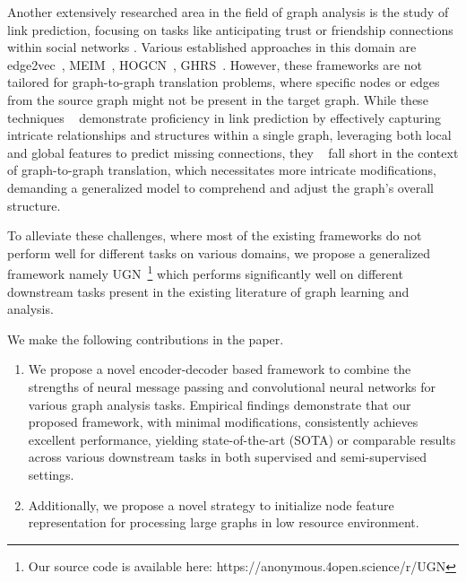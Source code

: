 Another extensively researched area in the field of graph analysis is the study of link prediction, focusing on tasks like anticipating trust or friendship connections within social networks \cite{wang2020edge2vec, Tang-etal12c, leskovec2009community}. Various established approaches in this domain are edge2vec~\cite{wang2020edge2vec}, MEIM~\cite{DBLP:conf/ijcai/TranT22}, HOGCN~\cite{kishan2021predicting}, GHRS~\cite{darban2022ghrs}. However, these frameworks are not tailored for graph-to-graph translation problems, where specific nodes or edges from the source graph might not be present in the target graph. While these techniques ~\cite{wang2020edge2vec,kishan2021predicting} demonstrate proficiency in link prediction by effectively capturing intricate relationships and structures within a single graph, leveraging both local and global features to predict missing connections, they ~\cite{wang2020edge2vec,darban2022ghrs} fall short in the context of graph-to-graph translation, which necessitates more intricate modifications, demanding a generalized model to comprehend and adjust the graph's overall structure.


To alleviate these challenges, where most of the existing frameworks do not perform well for different tasks on various domains, we propose a generalized framework namely UGN~\footnote{Our source code is available here: https://anonymous.4open.science/r/UGN} which performs significantly well on different downstream tasks present in the existing literature of graph learning and analysis.

We make the following contributions in the paper.
\begin{enumerate}
\item We propose a novel encoder-decoder based framework to combine the strengths of neural message passing and convolutional neural networks for various graph analysis tasks. Empirical findings demonstrate that our proposed framework, with minimal modifications, consistently achieves excellent performance, yielding  state-of-the-art (SOTA) or comparable results across various downstream tasks in both supervised and semi-supervised settings.

\item Additionally, we propose a novel strategy to initialize node feature representation for processing large graphs in low resource environment.
\end{enumerate}


